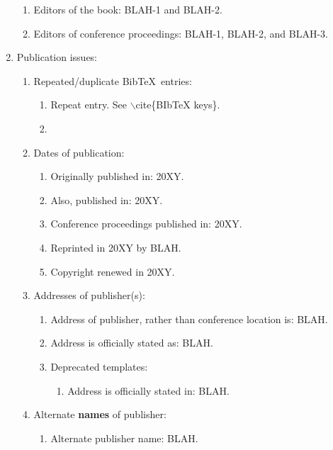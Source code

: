 \documentclass[letter,12pt]{article}
\begin{document}
\begin{enumerate}
\begin{enumerate}
	\item Editors of the book: BLAH-1 and BLAH-2.
	\item Editors of conference proceedings: BLAH-1, BLAH-2, and BLAH-3.
	\end{enumerate}
\item Publication issues: \vspace{-0.3cm}
	\begin{enumerate} \itemsep -2pt
	\item Repeated/duplicate {\sc Bib}\TeX\ entries: \vspace{-0.2cm}
		\begin{enumerate} \itemsep -2pt
		\item Repeat entry. See $\backslash$cite\{BIbTeX keys\}.
		\item 
		\end{enumerate}
	\item Dates of publication: \vspace{-0.2cm}
		\begin{enumerate} \itemsep -2pt
		\item Originally published in: 20XY.
		\item Also, published in: 20XY.
		\item Conference proceedings published in: 20XY.
		\item Reprinted in 20XY by BLAH.
		\item Copyright renewed in 20XY.
		\end{enumerate}
	\item Addresses of publisher(s): \vspace{-0.2cm}
		\begin{enumerate} \itemsep -2pt
		\item Address of publisher, rather than conference location is: BLAH.
		\item Address is officially stated as: BLAH.
		\item Deprecated templates: \vspace{-0.1cm}
			\begin{enumerate} \itemsep -1pt
			\item Address is officially stated in: BLAH.
			\end{enumerate}
		\end{enumerate}
	\item Alternate {\bf names} of publisher: \vspace{-0.2cm}
		\begin{enumerate} \itemsep -2pt
		\item Alternate publisher name: BLAH.

\end{enumerate}
\end{enumerate}
\end{enumerate}
\end{document}
